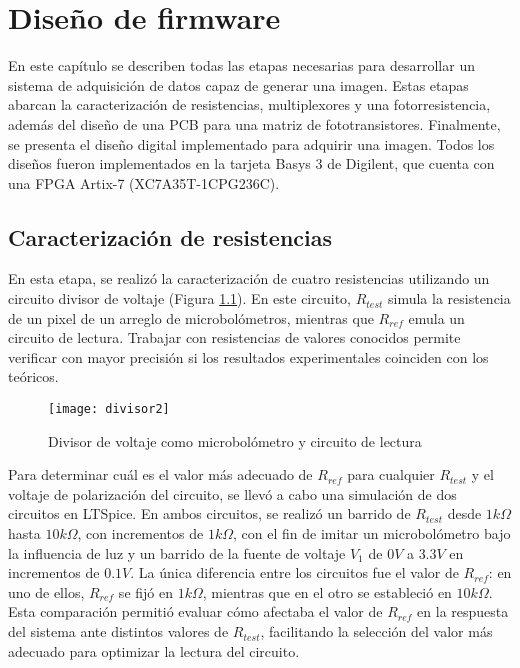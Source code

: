 \chapter{Diseño de firmware}
En este capítulo se describen todas las etapas necesarias para desarrollar un sistema de adquisición de datos capaz de generar una imagen. Estas etapas abarcan la caracterización de resistencias, multiplexores y una fotorresistencia, además del diseño de una PCB para una matriz de fototransistores. Finalmente, se presenta el diseño digital implementado para adquirir una imagen. Todos los diseños fueron implementados en la tarjeta Basys 3 de Digilent, que cuenta con una FPGA Artix-7 (XC7A35T-1CPG236C).

\section{Caracterización de resistencias}
En esta etapa, se realizó la caracterización de cuatro resistencias utilizando un circuito divisor de voltaje (Figura \ref{fig:divisor2}). En este circuito, $R_{test}$ simula la resistencia de un pixel de un arreglo de microbolómetros, mientras que $R_{ref}$ emula un circuito de lectura. Trabajar con resistencias de valores conocidos permite verificar con mayor precisión si los resultados experimentales coinciden con los teóricos. 


            \begin{figure}[hbtp]
                \centering
                \texttt{[image: divisor2]}
                \caption{Divisor de voltaje como microbolómetro y circuito de lectura}
                \label{fig:divisor2}
            \end{figure} 


Para determinar cuál es el valor más adecuado de $R_{ref}$ para cualquier $R_{test}$ y el voltaje de polarización del circuito, se llevó a cabo una simulación de dos circuitos en LTSpice. En ambos circuitos, se realizó un barrido de $R_{test}$ desde $1k\Omega$ hasta $10k\Omega$, con incrementos de $1k\Omega$, con el fin de imitar un microbolómetro bajo la influencia de luz y un barrido de la fuente de voltaje $V_{1}$ de $0V$ a $3.3V$ en incrementos de $0.1V$. La única diferencia entre los circuitos fue el valor de $R_{ref}$: en uno de ellos, $R_{ref}$ se fijó en $1k\Omega$, mientras que en el otro se estableció en $10k\Omega$. Esta comparación permitió evaluar cómo afectaba el valor de $R_{ref}$ en la respuesta del sistema ante distintos valores de $R_{test}$, facilitando la selección del valor más adecuado para optimizar la lectura del circuito.

